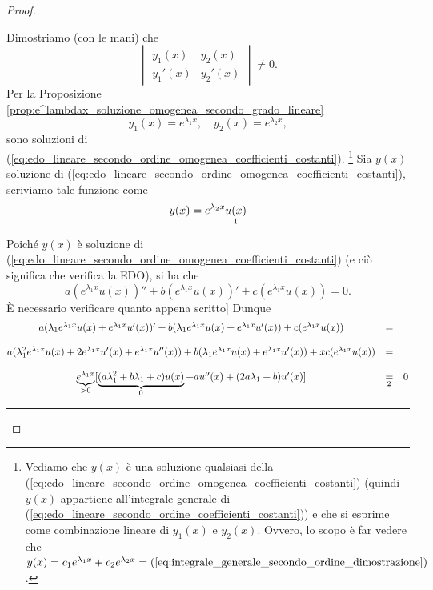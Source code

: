 \begin{proof}
\begin{enumerate}
		\noindent Dimostriamo (con le mani) che
		\begin{equation*}
				\begin{vmatrix}
						y_1(x) & y_2(x)\\
						y_1'(x) & y_2'(x)
				\end{vmatrix}\neq 0.
		\end{equation*} 
		Per la Proposizione \ref{prop:e^lambdax_soluzione_omogenea_secondo_grado_lineare}
		\begin{equation*}
			y_1(x) = e^{\lambda_1 x},\quad y_2(x) = e^{\lambda_2 x},
		\end{equation*}
		sono soluzioni di (\ref{eq:edo_lineare_secondo_ordine_omogenea_coefficienti_costanti}).
		\footnote{Vediamo che $y(x)$ è una soluzione qualsiasi della (\ref{eq:edo_lineare_secondo_ordine_omogenea_coefficienti_costanti}) (quindi $y(x)$ appartiene all'integrale generale di (\ref{eq:edo_lineare_secondo_ordine_coefficienti_costanti})) e che si esprime come combinazione lineare di $y_1(x)$ e $y_2(x)$. Ovvero, lo scopo è far vedere che $y(x)=c_1 e^{\lambda_1x}+c_2e^{\lambda_2 x}=(\ref{eq:integrale_generale_secondo_ordine_dimostrazione})$.} Sia $y(x)$ soluzione di  (\ref{eq:edo_lineare_secondo_ordine_omogenea_coefficienti_costanti}), scriviamo tale funzione come
		\begin{equation}\label{eq:integrale_generale_secondo_ordine_dimostrazione}
			y(x) = e^{\lambda_2 x}\underset{\footnotemark}{u(x)}
		\end{equation}
		Poiché $y(x)$ è soluzione di  (\ref{eq:edo_lineare_secondo_ordine_omogenea_coefficienti_costanti}) (e ciò significa che verifica la EDO), si ha che
		\begin{equation*}
			a(e^{\lambda_1x}u(x))''+ b(e^{\lambda_1x}u(x))'+ c (e^{\lambda_1x}u(x)) = 0.
		\end{equation*}
		È necessario verificare quanto appena scritto] Dunque
		\begin{equation}\label{eq:dimostrazione_th_soluzioni_edo_secondo_ordine}
			\begin{matrix}
				a(\lambda_1e^{\lambda_1x}u(x)+e^{\lambda_1x}u'(x))' + b(\lambda_1 e^{\lambda_1 x}u(x) + e^{\lambda_1x}u'(x)) + c(e^{\lambda_1x}u(x)) &=&\\\\
				a(\lambda_1^2e^{\lambda_1 x}u(x) + 2 e^{\lambda_1 x} u'(x) + e^{\lambda_1 x}u''(x))+ b (\lambda_1 e^{\lambda_1 x}u(x) + e^{\lambda_1 x}u'(x)) + x
				c(e^{\lambda_1 x}u(x)) &=&\\\\
				 \underbrace{e^{\lambda_1 x}}_{>0} [\underbrace{(a\lambda_1^2+b\lambda_1 +c) u(x)}_{0} + a u''(x)+(2a\lambda_1 + b)u'(x)] &\underset{\footnotemark}{=}& 0
			\end{matrix}
		\end{equation}
		\hrule\vspace{-12px}

\end{enumerate}
\end{proof}
